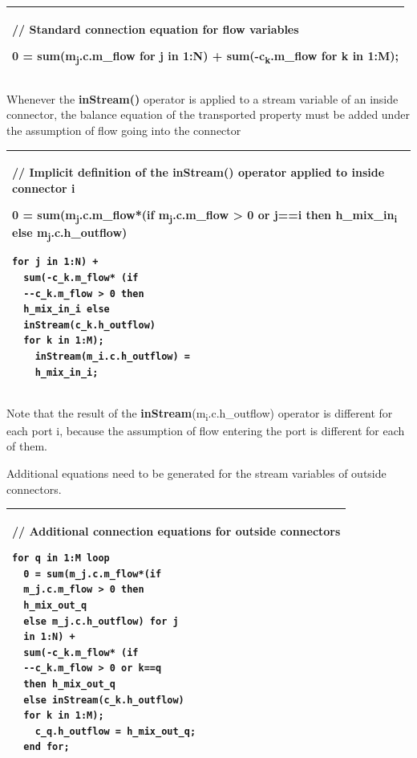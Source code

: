 \documentclass[10pt,a4paper]{report}
\begin{document}
\begin{longtable}[]{@{}l@{}}
\hline
\endhead
\begin{minipage}[t]{0.97\columnwidth}\raggedright
// Standard connection equation for flow variables

0 = sum(m\textsubscript{j}.c.m\_flow \textbf{for} j \textbf{in} 1:N) +
sum(-c\textsubscript{k}.m\_flow \textbf{for} k \textbf{in} 1:M);\strut
\end{minipage}\\ \hline

\end{longtable}

Whenever the \textbf{inStream()} operator is applied to a stream
variable of an inside connector, the balance equation of the transported
property must be added under the assumption of flow going into the
connector

\begin{longtable}[]{@{}l@{}}
\hline
\endhead
\begin{minipage}[t]{0.97\columnwidth}\raggedright
// Implicit definition of the \textbf{inStream()} operator applied to
inside connector i

0 = sum(m\textsubscript{j}.c.m\_flow*(\textbf{if}
m\textsubscript{j}.c.m\_flow \textgreater{} 0 \textbf{or} j==i
\textbf{then} h\_mix\_in\textsubscript{i} \textbf{else}
m\textsubscript{j}.c.h\_outflow)

\begin{lstlisting}[language=modelica]
for j in 1:N) +
  sum(-c_k.m_flow* (if
  --c_k.m_flow > 0 then
  h_mix_in_i else
  inStream(c_k.h_outflow)
  for k in 1:M);
    inStream(m_i.c.h_outflow) =
    h_mix_in_i;
\end{lstlisting}
\end{minipage}\\ \hline

\end{longtable}

Note that the result of the
\textbf{inStream}(m\textsubscript{i}.c.h\_outflow) operator is different
for each port i, because the assumption of flow entering the port is
different for each of them.

Additional equations need to be generated for the stream variables of
outside connectors.

\begin{longtable}[]{@{}l@{}}
\hline
\endhead
\begin{minipage}[t]{0.97\columnwidth}\raggedright
// Additional connection equations for outside connectors

\begin{lstlisting}[language=modelica]
for q in 1:M loop
  0 = sum(m_j.c.m_flow*(if
  m_j.c.m_flow > 0 then
  h_mix_out_q
  else m_j.c.h_outflow) for j
  in 1:N) +
  sum(-c_k.m_flow* (if
  --c_k.m_flow > 0 or k==q
  then h_mix_out_q
  else inStream(c_k.h_outflow)
  for k in 1:M);
    c_q.h_outflow = h_mix_out_q;
  end for;
\end{lstlisting}
\end{minipage}\\ \hline

\end{longtable}
\end{document}
